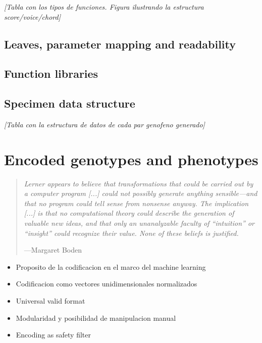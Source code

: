\documentclass{article}
\begin{document}
{\color{gray} \textsl{[Tabla con los tipos de funciones. Figura ilustrando la estructura score/voice/chord]}}

\subsection{Leaves, parameter mapping and readability}

\subsection{Function libraries}

\subsection{Specimen data structure}


{\color{gray} \textsl{[Tabla con la estructura de datos de cada par geno\/feno generado]}}



\section{Encoded genotypes and phenotypes}

\begin{samepage}
\begin{quotation}
\textsl{Lerner appears to believe that transformations that could be carried
out by a computer program [...] could not possibly generate anything sensible---and that no program could tell sense from nonsense anyway. The implication [...] is that no computational theory could describe the generation of valuable new ideas, and that only an unanalyzable faculty of ``intuition'' or ``insight'' could recognize their value. None of these beliefs is justified.}

---Margaret Boden \cite{BodenWhatIsCr}
\end{quotation}
\end{samepage}


{\color{gray}


\begin{itemize}
\item Proposito de la codificacion en el marco del machine learning
\item Codificacion como vectores unidimensionales normalizados
\item Universal valid format
\item Modularidad y posibilidad de manipulacion manual
\item Encoding as safety filter

\end{itemize}

}
\end{document}
